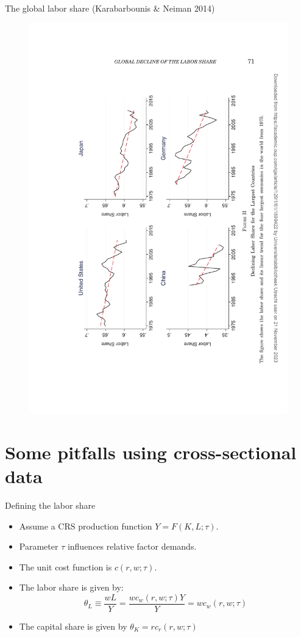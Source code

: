\documentclass[notes=show]{beamer}
\begin{document}
\begin{frame}{The global labor share (Karabarbounis \& Neiman 2014)}
\begin{figure}[p!]
 \includegraphics[width=.7\textwidth, angle=-90]{figures/figure-KN-1.pdf} 
\end{figure}
\end{frame}

\section{Some pitfalls using cross-sectional data}

\begin{frame}{Defining the labor share}
\begin{itemize}
\item Assume a CRS production function $Y = F(K,L; \tau)$. \medskip
\item Parameter $\tau$ influences relative factor demands. \medskip
\item The unit cost function is $c(r,w; \tau)$. \medskip
\item The labor share is given by:
\begin{equation*}
    \theta_{L} \equiv \frac{wL}{Y} = \frac{w c_{w}(r,w;\tau)Y}{Y} = w c_{w}(r,w;\tau)    
\end{equation*}
\item The capital share is given by $\theta_{K} = r c_{r}(r,w;\tau)$
\end{itemize}
\end{frame}
\end{document}

